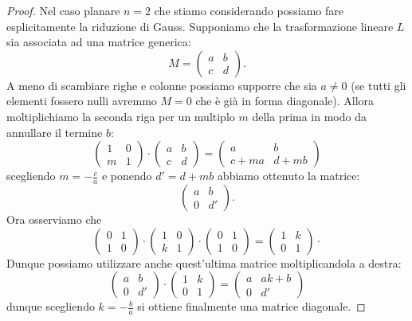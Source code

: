 \begin{proof}
Nel caso planare $n=2$ che stiamo considerando possiamo fare esplicitamente la riduzione di Gauss. 
Supponiamo che la trasformazione lineare $L$ sia associata ad una matrice generica:
\[
  M = \begin{pmatrix} a&b\\c&d\end{pmatrix}.
\]
A meno di scambiare righe e colonne possiamo supporre che sia $a\neq 0$ 
(se tutti gli elementi fossero nulli avremmo $M=0$ che è già in forma diagonale). 
Allora moltiplichiamo la seconda riga per un multiplo $m$ della prima in modo da annullare il termine $b$:
\[
\begin{pmatrix} 1&0\\m&1\end{pmatrix}\cdot
    \begin{pmatrix} a&b\\c&d\end{pmatrix}
  =
  \begin{pmatrix} a&b\\c+ma&d+mb\end{pmatrix}
\]
scegliendo $m=-\frac c a$
e ponendo $d'=d+mb$
abbiamo ottenuto la matrice:
\[
\begin{pmatrix} a&b\\0&d'\end{pmatrix}.
\]
Ora osserviamo che
\[
      \begin{pmatrix} 0&1\\1&0\end{pmatrix}\cdot
      \begin{pmatrix} 1&0\\k&1\end{pmatrix}\cdot
      \begin{pmatrix} 0&1\\1&0\end{pmatrix}
      =
      \begin{pmatrix} 1&k\\0&1\end{pmatrix}\cdot
\]
Dunque possiamo utilizzare anche quest'ultima matrice
moltiplicandola a destra:
\[
\begin{pmatrix} a&b\\0&d'\end{pmatrix}\cdot
  \begin{pmatrix} 1&k\\0&1\end{pmatrix}
  =
  \begin{pmatrix} a&ak+b\\0&d'\end{pmatrix}
\]
dunque scegliendo $k=-\frac b a$ si ottiene finalmente
una matrice diagonale.
\end{proof}

